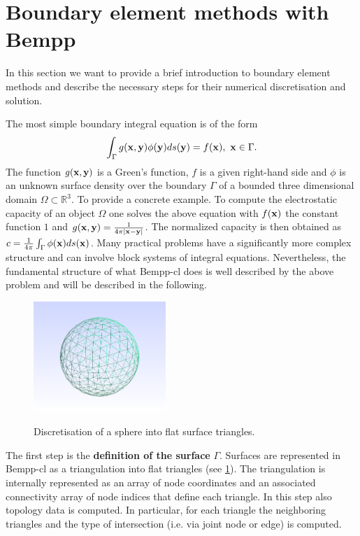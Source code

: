 \section{Boundary element methods with Bempp}
In this section we want to provide a brief introduction to boundary element methods and describe the necessary steps for their numerical discretisation and solution.

The most simple boundary integral equation is of the form
\begin{equation}
	\label{eq:bnd_integral}
	\int_{\Gamma} g(\bx, \by)\phi(\by)ds(\by) = f(\bx),~\bx\in\Gamma.
\end{equation}
The function $g(\mathbf{x}, \mathbf{y})$ is a Green's function, $f$ is a given right-hand side and $\phi$ is an unknown surface density over the boundary $\Gamma$ of a bounded three dimensional domain $\Omega\subset\mathbb{R}^3$. To provide a concrete example. To compute the electrostatic capacity of an object $\Omega$ one solves the above equation with $f(\mathbf{x})$ the constant function $1$ and $g(\mathbf{x},\mathbf{y})=\frac{1}{4\pi|\mathbf{x} - \mathbf{y}|}$. The normalized capacity is then obtained as $c = \frac{1}{4\pi}\int_{\Gamma}\phi(\mathbf{x})ds(\mathbf{x})$. Many practical problems have a significantly more complex structure and can involve block systems of integral equations. Nevertheless, the fundamental structure of what Bempp-cl does is well described by the above problem and will be described in the following.

\begin{figure}
	\center
	\includegraphics[width=5cm]{img/sphere}
	\label{fig:triangulation}
	\caption{Discretisation of a sphere into flat surface triangles.}
\end{figure}

The first step is the \textbf{definition of the surface} $\Gamma$. Surfaces are represented in Bempp-cl as a triangulation into flat triangles (see \ref{fig:triangulation}). The triangulation is internally represented as an array of node coordinates and an associated connectivity array of node indices that define each triangle. In this step also topology data is computed. In particular, for each triangle the neighboring triangles and the type of intersection (i.e. via joint node or edge) is computed.

